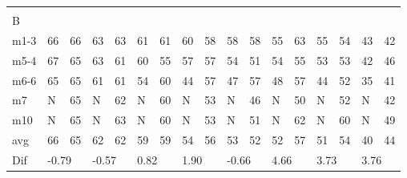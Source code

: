 \begin{table}[H]
\begin{tabular}{l|l|l|l|l|l|l|l|l|l|l|l|l|l|l|l|l}
\multicolumn{17}{l}{ } \\   
B & \multicolumn{2}{l|}{} & \multicolumn{2}{l|}{} & \multicolumn{2}{l|}{} & \multicolumn{2}{l|}{} & \multicolumn{2}{l|}{} & \multicolumn{2}{l|}{}& \multicolumn{2}{l|}{}& \multicolumn{2}{l}{}     \\ \hline
m1-3   &    66    &    66    &   63    &   63       &    61   &   61    &   60     &   58     &    58   &    58     &    55   &     63     &      55   &    54    &  43 &  42  \\
m5-4   &    67    &    65    &   63    &  61        &    60   &  55     &   57     &    57    &  54     &     51    &   54    &     55     &     53    &    53    &  42 &  46  \\
m6-6   &   65     &   65     &   61    &  61        &   54    &   60    &    44    &    57    &   47    &     57    &     48  &    57      &     44    &   52     &  35 &  41  \\
m7      &   N       &      65  &    N    &     62     &    N     &   60    &   N      &    53    &   N     &      46   &   N      &      50    &     N     &     52   &   N  &   42 \\
m10    &   N       &    65    &    N    &     63     &    N     &   60    &   N      &    53    &   N     &     51    &     N    &     62     &     N     &     60   &    N  &  49  \\ \hline
avg     &     66    &     65   &    62   &     62     &     59  &   59    &   54     &   56     &     53  &  52       &     52   &    57     &       51  &   54     & 40   & 44\\ \hline
Dif & \multicolumn{2}{l|}{-0.79} & \multicolumn{2}{l|}{-0.57} & \multicolumn{2}{l|}{0.82} & \multicolumn{2}{l|}{1.90} & \multicolumn{2}{l|}{-0.66} & \multicolumn{2}{l|}{4.66}& \multicolumn{2}{l|}{3.73}& \multicolumn{2}{l}{3.76}       
\end{tabular}
\label{ta:meas:approved_data_par}
\end{table}


